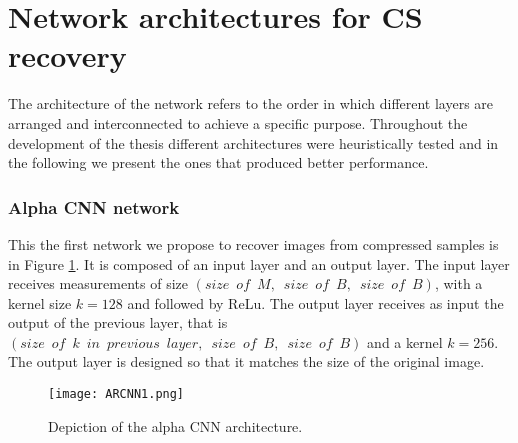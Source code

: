 \section{Network architectures for CS recovery}
The architecture of the network refers to the order in which different layers are arranged and interconnected to achieve a specific purpose. Throughout the development of the thesis different architectures were heuristically tested and in the following we present the ones that produced better performance.
\subsubsection{Alpha CNN network}
This the first network we propose to recover images from compressed samples is in Figure \ref{fig:ARCNNim1}. It is composed of an input layer and an output layer. The input layer receives measurements of size $(size \enspace of \enspace M ,\enspace size \enspace of \enspace B , \enspace size \enspace of \enspace B)$, with a kernel size $k=128$ and followed by ReLu. The output layer receives as input the output of the previous layer, that is $(size \enspace of \enspace k \enspace in \enspace previous \enspace layer ,\enspace size \enspace of \enspace B , \enspace size \enspace of \enspace B)$ and a kernel $k=256$. The output layer is designed so that it matches the size of the original image.  
\begin{figure}[tb] 
\centering 
\texttt{[image: ARCNN1.png]} 
\caption[Alpha CNN architecture for recovery ]{Depiction of the alpha CNN architecture.}
\label{fig:ARCNNim1} 
\end{figure}

